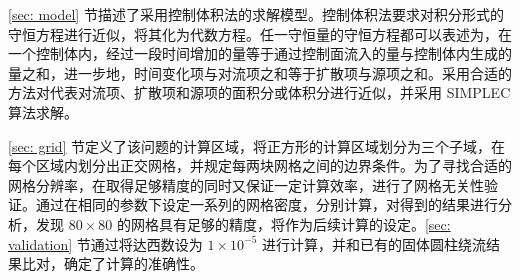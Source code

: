 
\ref{sec: model} 节描述了采用控制体积法的求解模型。控制体积法要求对积分形式的守恒方程进行近似，将其化为代数方程。任一守恒量的守恒方程都可以表述为，在一个控制体内，经过一段时间增加的量等于通过控制面流入的量与控制体内生成的量之和，进一步地，时间变化项与对流项之和等于扩散项与源项之和。采用合适的方法对代表对流项、扩散项和源项的面积分或体积分进行近似，并采用 SIMPLEC 算法求解。

\ref{sec: grid} 节定义了该问题的计算区域，将正方形的计算区域划分为三个子域，在每个区域内划分出正交网格，并规定每两块网格之间的边界条件。为了寻找合适的网格分辨率，在取得足够精度的同时又保证一定计算效率，进行了网格无关性验证。通过在相同的参数下设定一系列的网格密度，分别计算，对得到的结果进行分析，发现 $80\times 80$ 的网格具有足够的精度，将作为后续计算的设定。\ref{sec: validation} 节通过将达西数设为 $1\times 10^{-5}$ 进行计算，并和已有的固体圆柱绕流结果比对，确定了计算的准确性。
